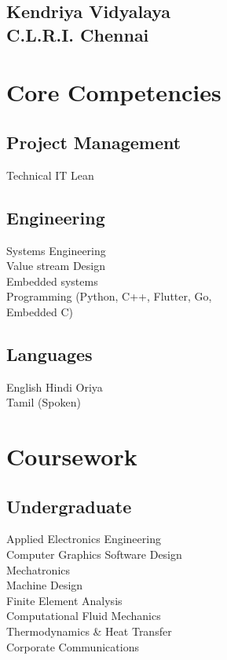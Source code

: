 \documentclass[]{deedy-resume-openfont}
\begin{document}
\begin{minipage}[t]{0.33\textwidth}
\subsection{Kendriya Vidyalaya \\C.L.R.I. Chennai}
\sectionsep

\section{Core Competencies}
\subsection{Project Management}
Technical \textbullet{} IT  \textbullet{} Lean
\sectionsep
\subsection{Engineering}
Systems Engineering \\Value stream Design \\
Embedded systems \\ Programming (Python, C++, Flutter, Go,\\Embedded C)
\sectionsep

\subsection{Languages}
English \textbullet{} Hindi \textbullet{} Oriya \\
Tamil (Spoken)


\sectionsep
\section{Coursework}
\subsection{Undergraduate}
Applied Electronics Engineering\\
Computer Graphics Software Design \\
Mechatronics \\
Machine Design \\
Finite Element Analysis\\
Computational Fluid Mechanics\\
Thermodynamics \& Heat Transfer\\
Corporate Communications\\
\sectionsep


%
%

\end{minipage} 
\end{document}
